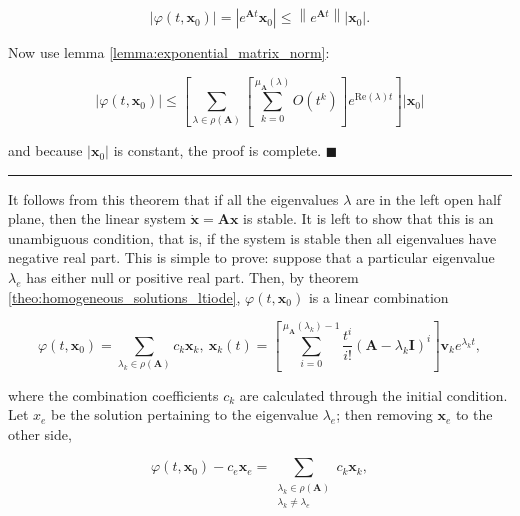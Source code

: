 \begin{equation} \left\lvert\varphi\left(t,\mathbf{x}_0\right)\right\rvert = \left\lvert e^{\mathbf{A}t}\mathbf{x}_0\right\rvert \leq \left\lVert e^{\mathbf{A}t}\right\rVert\left\lvert\mathbf{x}_0\right\rvert .\end{equation}

	Now use lemma \ref{lemma:exponential_matrix_norm}:

\begin{equation} \left\lvert\varphi\left(t,\mathbf{x}_0\right)\right\rvert \leq \left[\sum_{\lambda\in\rho\left(\mathbf{A}\right)} \left[ \sum_{k=0}^{\mu_\mathbf{A}\left(\lambda\right)} O\left(t^k\right)\right] e^{\text{Re}\left(\lambda\right) t}\right]\left\lvert\mathbf{x}_0\right\rvert \label{eq:exponential_char_theorem_final}\end{equation}

	\noindent and because $\left\lvert\mathbf{x}_0\right\rvert$ is constant, the proof is complete.
\hfill$\blacksquare$
\vspace{5mm}
\hrule
\vspace{5mm}

	It follows from this theorem that if all the eigenvalues $\lambda$ are in the left open half plane, then the linear system $\dot{\mathbf{x}} = \mathbf{Ax}$ is stable. It is left to show that this is an unambiguous condition, that is, if the system is stable then all eigenvalues have negative real part. This is simple to prove: suppose that a particular eigenvalue $\lambda_e$ has either null or positive real part. Then, by theorem \ref{theo:homogeneous_solutions_ltiode}, $\varphi\left(t,\mathbf{x}_0\right)$ is a linear combination

	\begin{equation} \varphi\left(t,\mathbf{x}_0\right) = \sum_{\lambda_k\in\rho\left(\mathbf{A}\right)} c_k\mathbf{x}_k,\ \mathbf{x}_k(t) =  \left[\displaystyle\sum\limits_{i=0}^{\mu_\mathbf{A}\left(\lambda_k\right)-1} \dfrac{t^i}{i!}\left(\mathbf{A} - \lambda_k\mathbf{I}\right)^{i}\right]\mathbf{v}_k e^{\lambda_k t}, \end{equation}

	\noindent where the combination coefficients $c_k$ are calculated through the initial condition. Let $x_e$ be the solution pertaining to the eigenvalue $\lambda_e$; then removing $\mathbf{x}_e$ to the other side,

\begin{equation} \varphi\left(t,\mathbf{x}_0\right) - c_e\mathbf{x}_e = \sum_{\substack{\lambda_k\in\rho\left(\mathbf{A}\right) \\ \lambda_k \neq \lambda_e} } c_k\mathbf{x}_k, \end{equation}

